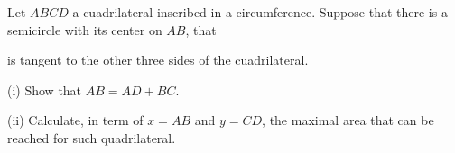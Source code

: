 Let $ ABCD$ a cuadrilateral inscribed in a circumference. Suppose that there is a semicircle with its center on $ AB$,  that

is tangent to the other three sides of the cuadrilateral.

(i) Show that $ AB = AD + BC$.

(ii) Calculate, in term of $ x = AB$ and $ y = CD$,  the maximal area that can be reached for such quadrilateral.